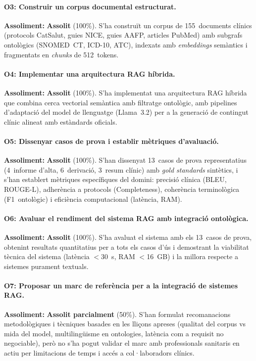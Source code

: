 \documentclass[CAT]{TFUOC}%
\begin{document}
\paragraph{O3: Construir un corpus documental estructurat.}
\textbf{Assoliment:} \textbf{Assolit} (100\%). S'ha construït un corpus de 155~documents clínics (protocols CatSalut, guies NICE, guies AAFP, articles PubMed) amb subgrafs ontològics (SNOMED~CT, ICD-10, ATC), indexats amb \textit{embeddings} semàntics i fragmentats en \textit{chunks} de 512~tokens.

\paragraph{O4: Implementar una arquitectura RAG híbrida.}
\textbf{Assoliment:} \textbf{Assolit} (100\%). S'ha implementat una arquitectura RAG híbrida que combina cerca vectorial semàntica amb filtratge ontològic, amb pipelines d'adaptació del model de llenguatge (Llama~3.2) per a la generació de contingut clínic alineat amb estàndards oficials.

\paragraph{O5: Dissenyar casos de prova i establir mètriques d'avaluació.}
\textbf{Assoliment:} \textbf{Assolit} (100\%). S'han dissenyat 13~casos de prova representatius (4~informe d'alta, 6~derivació, 3~resum clínic) amb \textit{gold standards} sintètics, i s'han establert mètriques específiques del domini: precisió clínica (BLEU, ROUGE-L), adherència a protocols (Completeness), coherència terminològica (F1~ontològic) i eficiència computacional (latència, RAM).

\paragraph{O6: Avaluar el rendiment del sistema RAG amb integració ontològica.}
\textbf{Assoliment:} \textbf{Assolit} (100\%). S'ha avaluat el sistema amb els 13~casos de prova, obtenint resultats quantitatius per a tots els casos d'ús i demostrant la viabilitat tècnica del sistema (latència $<$30~s, RAM $<$16~GB) i la millora respecte a sistemes purament textuals.

\paragraph{O7: Proposar un marc de referència per a la integració de sistemes RAG.}
\textbf{Assoliment:} \textbf{Assolit parcialment} (50\%). S'han formulat recomanacions metodològiques i tècniques basades en les lliçons apreses (qualitat del corpus vs mida del model, multilingüisme en ontologies, latència com a requisit no negociable), però no s'ha pogut validar el marc amb professionals sanitaris en actiu per limitacions de temps i accés a col·laboradors clínics.
\end{document}
